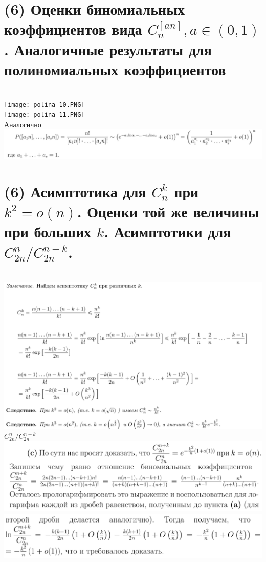 \section{ (6) Оценки биномиальных коэффициентов вида $C^{[an]}_n, a \in (0, 1)$. Аналогичные результаты для полиномиальных коэффициентов}
\
\\
\texttt{[image: polina\_10.PNG]}\\
\texttt{[image: polina\_11.PNG]}\\
Аналогично\\
\includegraphics[width=18cm]{images/polina_12_new.PNG}
\section{(6) Асимптотика для $C_n^k$ при $k^2 = o(n)$. Оценки той же величины при больших $k$. Асимптотики для $C_{2n}^n/C_{2n}^{n-k}$.}
\
\\
\includegraphics[width=18cm]{images/polina_12.PNG}\\
$C_{2n}^n/C_{2n}^{n-k}$\\
\includegraphics[width=15cm]{images/polina_15.PNG}\\
\includegraphics[width=15cm]{images/polina_16.PNG}
